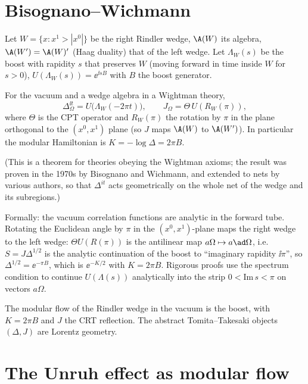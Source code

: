 \section{Bisognano--Wichmann}

Let $W=\{x:x^1>|x^0|\}$ be the right Rindler wedge, $\A(W)$ its algebra, $\A(W')=\A(W)'$ (Haag duality) that of the left wedge. Let $\Lambda_W(s)$ be the boost with rapidity $s$ that preserves $W$ (moving forward in time inside $W$ for $s>0$), $U(\Lambda_W(s))=\ee^{\ii sB}$ with $B$ the boost generator.

\begin{theorem}\label{thm:BW}
For the vacuum and a wedge algebra in a Wightman theory,
\begin{equation}
\Delta^{\ii t}_{\Omega}=U\big(\Lambda_W(-2\pi t)\big),\qquad J_\Omega=\Theta\,U(R_W(\pi)),
\end{equation}
where $\Theta$ is the CPT operator and $R_W(\pi)$ the rotation by $\pi$ in the plane orthogonal to the $(x^0,x^1)$ plane (so $J$ maps $\A(W)$ to $\A(W')$). In particular the modular Hamiltonian is $K=-\log\Delta=2\pi B$.
\end{theorem}
(This is a theorem for theories obeying the Wightman axioms; the result was proven in the 1970s by Bisognano and Wichmann, and extended to nets by various authors, so that $\Delta^{it}$ acts geometrically on the whole net of the wedge and its subregions.)

\begin{proofsketch}
Formally: the vacuum correlation functions are analytic in the forward tube. Rotating the Euclidean angle by $\pi$ in the $(x^0,x^1)$-plane maps the right wedge to the left wedge: $\Theta U(R(\pi))$ is the antilinear map $a\Omega\mapsto a\ad\Omega$, i.e.\ $S=J\Delta^{1/2}$ is the analytic continuation of the boost to ``imaginary rapidity $\ii\pi$'', so $\Delta^{1/2}=\ee^{-\pi B}$, which is $\ee^{-K/2}$ with $K=2\pi B$. Rigorous proofs use the spectrum condition to continue $U(\Lambda(s))$ analytically into the strip $0<\mathrm{Im}\,s<\pi$ on vectors $a\Omega$.
\end{proofsketch}

\begin{keyidea}
The modular flow of the Rindler wedge in the vacuum is the boost, with $K=2\pi B$ and $J$ the CRT reflection. The abstract Tomita--Takesaki objects $(\Delta,J)$ are Lorentz geometry.
\end{keyidea}

\section{The Unruh effect as modular flow}


